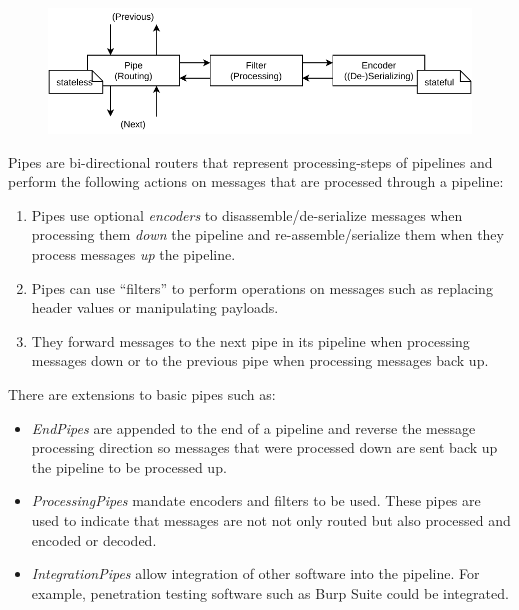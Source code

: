 \begin{figure}[h]
    \centering
    \includegraphics[width=14cm]{img/ch04/Architecture - Pipes and Filters3.pdf}
    \label{fig:design-pipes-and-filters}
\end{figure}
Pipes are bi-directional routers that represent processing-steps of pipelines and perform the following actions on messages that are processed through a pipeline:
\begin{enumerate}
    \item Pipes use optional \emph{encoders} to disassemble/de-serialize messages when processing them \emph{down} the pipeline and re-assemble/serialize them when they process messages \emph{up} the pipeline.
    \item Pipes can use \enquote{filters} to perform operations on messages such as replacing header values or manipulating payloads.
    \item They forward messages to the next pipe in its pipeline when processing messages down or to the previous pipe when processing messages back up.
\end{enumerate}
There are extensions to basic pipes such as:
\begin{itemize}
    \item \emph{EndPipes} are appended to the end of a pipeline and reverse the message processing direction so messages that were processed down are sent back up the pipeline to be processed up.
    \item \emph{ProcessingPipes} mandate encoders and filters to be used. These pipes are used to indicate that messages are not not only routed but also processed and encoded or decoded.
    \item \emph{IntegrationPipes} allow integration of other software into the pipeline. For example, penetration testing software such as Burp Suite could be integrated.
\end{itemize}

